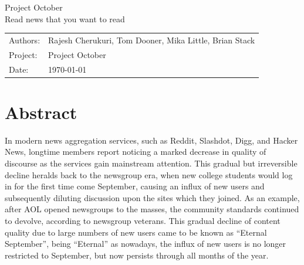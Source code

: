 \documentclass[11pt,letterpaper]{article}
\begin{document}

\newpage
\pagestyle{fancy}
\fancyhf{}
\vspace*{6cm}
\begin{center}
\Huge  {Project October}\\
\vspace{1cm}
\huge {Read news that you want to read}\\
\vspace{1cm}
\end{center}
\vfill
\begin{flushright}
\begin{tabular}{ll}
Authors: & Rajesh Cherukuri, Tom Dooner, Mika Little, Brian Stack\\
Project: & Project October\\
Date: & \today
\end{tabular}
\end{flushright}

\newpage
\pagestyle{fancy}
\fancyhf{}

\fancyhead[L]{\small \rm \textit{\rightmark}}
\fancyhead[R]{\small \rm \textbf{\thepage}}



\renewcommand{\sectionmark}[1]{\markright{\thesection.\ #1}}
\renewcommand{\headrulewidth}{0.5pt}
\renewcommand{\footrulewidth}{0.5pt}


\tableofcontents
\listoffigures

\newpage
\section{Abstract}

In modern news aggregation services, such as Reddit, Slashdot, Digg, and Hacker News, longtime members report noticing a marked decrease in quality of discourse as the services gain mainstream attention.
This gradual but irreversible decline heralds back to the newsgroup era, when new college students would log in for the first time come September, causing an influx of new users and subsequently diluting discussion upon the sites which they joined.
As an example, after AOL opened newsgroups to the masses, the community standards continued to
devolve, according to newsgroup veterans\cite{september}. This gradual decline of content quality due to
large numbers of new users came to be known as ``Eternal September'', being ``Eternal'' as nowadays,
the influx of new users is no longer restricted to September, but now persists through all months of the year.
\end{document}
